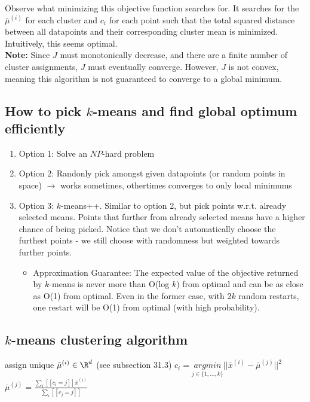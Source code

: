 \documentclass[12pt]{article}
\begin{document}
Observe what minimizing this objective function searches for. It searches for the $\bar {\mu}^{(i)}$ for each cluster and $c_i$ for each point such that the total squared distance between all datapoints and their corresponding cluster mean is minimized. Intuitively, this seems optimal.\\

\textbf{Note:} Since $J$ must monotonically decrease, and there are a finite number of cluster assignments, $J$ must eventually converge. However, $J$ is not convex, meaning this algorithm is not guaranteed to converge to a global minimum.

\subsection{How to pick $k$-means and find global optimum efficiently}

\begin{enumerate}
	\item Option 1: Solve an $NP$-hard problem
	\item Option 2: Randonly pick amongst given datapoints (or random points in space) $\rightarrow$ works sometimes, othertimes converges to only local minimums
	\item Option 3: $k$-means++. Similar to option 2, but pick points w.r.t. already selected means. Points that further from already selected means have a higher chance of being picked. Notice that we don't automatically choose the furthest points - we still choose with randomness but weighted towards further points.
		\begin{itemize}
			\item Approximation Guarantee: The expected value of the objective returned by $k$-means is never more than O(log $k$) from optimal and can be as close as O(1) from optimal. Even in the former case, with $2k$ random restarts, one restart will be O(1) from optimal (with high probability).
		\end{itemize}
\end{enumerate}

\subsection{$k$-means clustering algorithm}

\begin{algorithm} \label{alg:k-means clustering}
	\caption{$k$-means clustering}
	\begin{algorithmic}
			\State assign unique $\bar {\mu}^{(i)} \in \R^d$ (see subsection 31.3)
		\EndFor
				\State $c_i = \underset{j \in \{ 1, \dots, k \}}{argmin}||\bar x^{(i)} - \bar{\mu}^{(j)}||^2$
			\EndFor
				\State $\bar{\mu}^{(j)} = \frac{\sum_i [[c_i = j]]\bar x^{(i)}} {\sum_i[[c_j = j]]}$
			\EndFor
		\EndWhile
	\end{algorithmic}
\end{algorithm}
\end{document}
